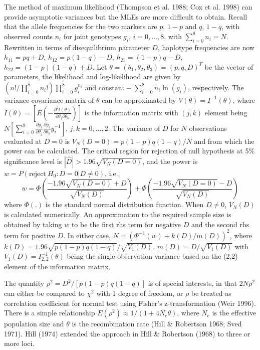 The method of maximum likelihood (Thompson et al.  1988; Cox et al.  1998) can
provide asymptotic variances but the MLEs are more difficult to obtain.  Recall
that the allele frequencies for the two markers are $p$, $1-p$ and $q$, $1-q$,
with observed counts $n_i$ for joint genotypes $g_i$, $i=0,\ldots,8$, with
$\sum_{i=0}^8n_i=N$.  Rewritten in terms of disequilibrium parameter $D$,
haplotype frequencies are now $h_{11}=pq+D$, $h_{12}=p(1-q)-D$,
$h_{21}=(1-p)q-D$, $h_{22}=(1-p)(1-q)+D$.  Let
$\theta=(\theta_1,\theta_2,\theta_3) =(p,q,D)^T$ be the vector of parameters,
the likelihood and log-likelihood are given by
$\left({n!}/{\prod_{i=0}^8n_i!}\right)\prod_{i=0}^8g_i ^ {n_i}$ and $
\mbox{constant}+\sum_{i=0}^8n_i\ln(g_i)$, respectively.  The
variance-covariance matrix of $\theta$ can be approximated by
$V(\theta)=I^{-1}(\theta)$, where
$I(\theta)=\left[E\left(-\frac{\partial^2l(\theta)}{\partial\theta_j\partial
\theta_k}\right)\right]$ is the information matrix with $(j,k)$ element being
$N \left [\sum_{i=0}^8 \frac{\partial y_i}{\partial\theta_j}\frac{\partial
y_i}{\partial\theta_k}y_i^{-1} \right ]$, $j, k=0,\ldots,2$.  The variance of
$D$ for $N$ observations evaluated at $D=0$ is $V_N(D=0)={p(1-p)q(1-q)}/{N}$
and from which the power can be calculated.  The critical region for rejection
of null hypothesis at 5\% significance level is $|\hat D|>1.96\sqrt{V_N(D=0)}$,
and the power is $w=P(\mbox{reject} ~H_0:D=0|D\neq 0)$, i.e.,
$$w=\Phi\left(\frac{-1.96\sqrt{V_N(D=0)}+D}{\sqrt{V_N(D)}}\right)
+\Phi\left(\frac{-1.96\sqrt{V_N(D=0)}-D}{\sqrt{V_N(D)}}\right)$$ where
$\Phi(.)$ is the standard normal distribution function.  When $D\neq 0$,
$V_N(D)$ is calculated numerically.  An approximation to the required sample
size is obtained by taking $w$ to be the first rhs term for negative $D$ and
the second rhs term for positive $D$.  In either case,
$N=\left({\Phi^{-1}(w)+k(D)}/{m(D)}\right)^2$, where
$k(D)=1.96\sqrt{p(1-p)q(1-q)}/\sqrt{V_1(D)}$, $m(D)=D/\sqrt{V_1(D)}$ with
$V_1(D)=I_{2,2}^{-1}(\theta)$ being the single-observation variance based on
the (2,2) element of the information matrix.

The quantity $\rho^2=D^2/[p(1-p)q(1-q)]$ is of special interests, in that
$2N\rho^2$ can either be compared to $\chi^2$ with 1 degree of freedom, or
$\rho$ be treated as correlation coefficient for normal test using Fisher's
z-transformation (Weir 1996).  There is a simple relationship $E(\rho^2)\approx
1/(1+4N_e\theta)$, where $N_e$ is the effective population size and $\theta$ is
the recombination rate (Hill \& Robertson 1968; Sved 1971).  Hill (1974)
extended the approach in Hill \& Robertson (1968) to three or more loci.

